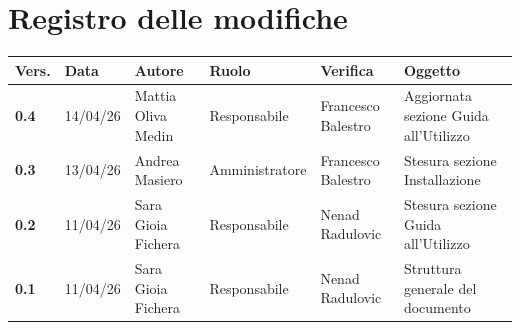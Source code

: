 \documentclass[a4paper,12pt]{article}
\begin{document}
    

    \section*{Registro delle modifiche} {
        \begin{table}[h!]
                \begin{tabularx}{\textwidth}{|l|l|l|l|L|L|}
                \hline
                \textbf{Vers.} & \textbf{Data} & \textbf{Autore} & \textbf{Ruolo} & \textbf{Verifica} & \textbf{Oggetto} \\
                \hline
                \textbf{0.4} & 14/04/26 & Mattia Oliva Medin & Responsabile & Francesco Balestro & Aggiornata sezione Guida all'Utilizzo\\
                \hline
                \textbf{0.3} & 13/04/26 & Andrea Masiero & Amministratore & Francesco Balestro & Stesura sezione Installazione\\
                \hline
                \textbf{0.2} & 11/04/26 & Sara Gioia Fichera & Responsabile & Nenad Radulovic & Stesura sezione Guida all'Utilizzo\\
                \hline
                \textbf{0.1} & 11/04/26 & Sara Gioia Fichera & Responsabile & Nenad Radulovic & Struttura generale del documento\\
                \hline
            \end{tabularx}
        \end{table}
    }
    \newpage
    
    \tableofcontents
    \newpage

    \listoffigures
    \newpage
    
    \listoftables
    \newpage
\end{document}
